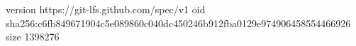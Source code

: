 version https://git-lfs.github.com/spec/v1
oid sha256:c6fb849671904c5e089860c040dc450246b912fba0129e974906458554466926
size 1398276
